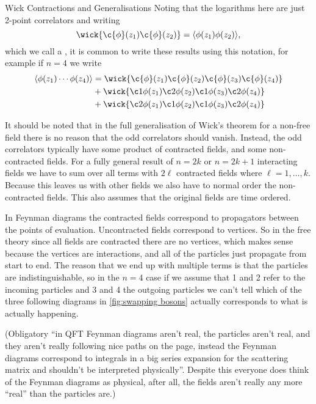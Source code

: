 \documentclass[fleqn]{NotesClass}
\DeclarePairedDelimiter{\correlator}{\langle}{\rangle}
\begin{document}
    \begin{remark}{Wick Contractions and Generalisations}{}
        Noting that the logarithms here are just 2-point correlators and writing
        \begin{equation}
            \wick{\c{\phi}(z_1)\c{\phi}(z_2)} = \correlator{\phi(z_1)\phi(z_2)},
        \end{equation}
        which we call a , it is common to write these results using this notation, for example if \(n = 4\) we write
        \begin{align}
            \correlator{\phi(z_1) \dotsm \phi(z_{4})} &= \wick{\c{\phi}(z_1)\c{\phi}(z_2)\c{\phi}(z_3)\c{\phi}(z_4)}\\
            &+ \wick{\c1{\phi}(z_1)\c2{\phi}(z_2)\c1{\phi}(z_3)\c2{\phi}(z_4)}\\
            &+ \wick{\c2{\phi}(z_1)\c1{\phi}(z_2)\c1{\phi}(z_3)\c2{\phi}(z_4)}
        \end{align}
        
        It should be noted that in the full generalisation of Wick's theorem for a non-free field there is no reason that the odd correlators should vanish.
        Instead, the odd correlators typically have some product of contracted fields, and some non-contracted fields.
        For a fully general result of \(n = 2k\) or \(n = 2k + 1\) interacting fields we have to sum over all terms with \(2\ell\) contracted fields where \(\ell = 1, \dotsc, k\).
        Because this leaves us with other fields we also have to normal order the non-contracted fields.
        This also assumes that the original fields are time ordered.
        
        In Feynman diagrams the contracted fields correspond to propagators between the points of evaluation.
        Uncontracted fields correspond to vertices.
        So in the free theory since all fields are contracted there are no vertices, which makes sense because the vertices are interactions, and all of the particles just propagate from start to end.
        The reason that we end up with multiple terms is that the particles are indistinguishable, so in the \(n = 4\) case if we assume that 1 and 2 refer to the incoming particles and 3 and 4 the outgoing particles we can't tell which of the three following diagrams in \cref{fig:swapping bosons} actually corresponds to what is actually happening.
        
        (Obligatory \enquote{in QFT Feynman diagrams aren't real, the particles aren't real, and they aren't really following nice paths on the page, instead the Feynman diagrams correspond to integrals in a big series expansion for the scattering matrix and shouldn't be interpreted physically}. Despite this everyone does think of the Feynman diagrams as physical, after all, the fields aren't really any more \enquote{real} than the particles are.)
    \end{remark}
    
\end{document}
